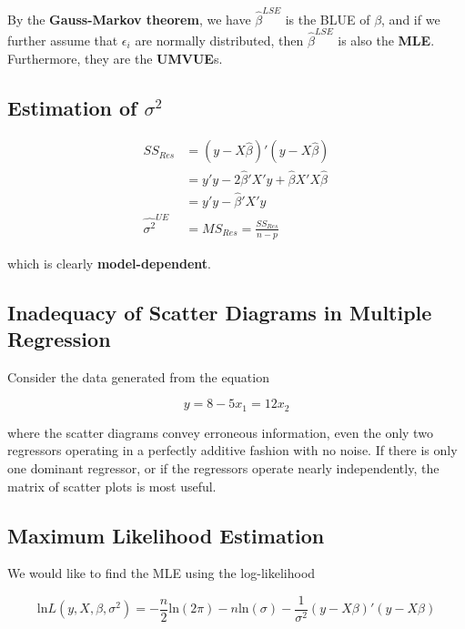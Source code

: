 \documentclass[12pt]{article}
\begin{document}
By the \textbf{Gauss-Markov theorem}, we have $\hat{\beta}^{LSE}$ is the BLUE of $\beta$, and if we further assume that $\epsilon_i$ are normally distributed, then $\hat{\beta}^{LSE}$ is also the \textbf{MLE}. Furthermore, they are the \textbf{UMVUE}s.



\subsection{Estimation of $\sigma^2$}

$$
\begin{aligned}
SS_{Res} &= \left( y - X \hat{\beta}  \right)' \left( y - X \hat{\beta}  \right) \\[8pt]
&= y'y - 2 \hat{\beta}' X' y + \hat{\beta} X' X \hat{\beta} \\[8pt]
&= y'y - \hat{\beta}' X' y \\[10pt]
\hat{\sigma^2}^{UE} &=  MS_{Res} = \frac{SS_{Res}}{n-p}
\end{aligned}
$$

which is clearly \textbf{model-dependent}. 



\subsection{Inadequacy of Scatter Diagrams in Multiple Regression}

Consider the data generated from the equation

$$
y = 8 - 5 x_1 = 12 x_2
$$

where the scatter diagrams convey erroneous information, even the only two regressors operating in a perfectly additive fashion with no noise. If there is only one dominant regressor, or if the regressors operate nearly independently, the matrix of scatter plots is most useful. 



\subsection{Maximum Likelihood Estimation}

We would like to find the MLE using the log-likelihood 

$$
\mathrm{ln} L (y, X, \beta, \sigma^2) = -\frac{n}{2} \mathrm{ln} (2\pi) - n \mathrm{ln}(\sigma) - \frac{1}{\sigma^2} ( y- X\beta)' (y - X\beta)
$$
\end{document}
